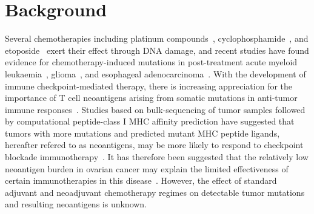 \section*{Background}

Several chemotherapies including platinum compounds~\cite{Hannan_1989}, cyclophosphamide~\cite{Anderson_1995}, and etoposide~\cite{NAKANOMYO_1986} exert their effect through DNA damage, and recent studies have found evidence for chemotherapy-induced mutations in post-treatment acute myeloid leukaemia~\cite{Ding_2012}, glioma~\cite{Johnson_2013}, and esophageal adenocarcinoma~\cite{Murugaesu_2015}. With the development of immune checkpoint-mediated therapy\cite{Chen_2013}, there is increasing appreciation for the importance of T cell neoantigens arising from somatic mutations in anti-tumor immune responses~\cite{Schumacher_2015}. Studies based on bulk-sequencing of tumor samples followed by computational peptide-class I MHC affinity prediction have suggested that tumors with more mutations and predicted mutant MHC peptide ligands, hereafter refered to as neoantigens, may be more likely to respond to checkpoint blockade immunotherapy~\cite{Van_Allen_2015,Rizvi_2015}. It has therefore been suggested that the relatively low neoantigen burden in ovarian cancer may explain the limited effectiveness of certain immunotherapies in this disease~\cite{Martin_2016}. However, the effect of standard adjuvant and neoadjuvant chemotherapy regimes on detectable tumor mutations and resulting neoantigens is unknown.


